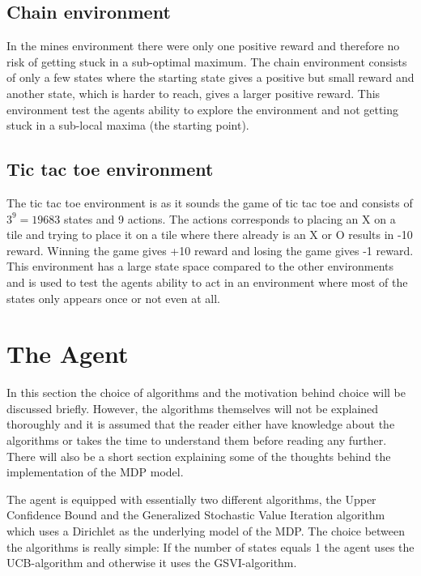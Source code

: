\documentclass[11pt]{article}
\numberwithin{equation}{section}
\begin{document}
\begin{flushleft}
\subsection{Chain environment}

In the mines environment there were only one positive reward and therefore no risk of getting stuck in a sub-optimal maximum. The chain environment consists of only a few states where the starting state gives a positive but small reward and another state, which is harder to reach, gives a larger positive reward. This environment test the agents ability to explore the environment and not getting stuck in a sub-local maxima (the starting point).

\subsection{Tic tac toe environment}

The tic tac toe environment is as it sounds the game of tic tac toe and consists of $3^9=19683$ states and 9 actions. The actions corresponds to placing an X on a tile and trying to place it on a tile where there already is an X or O results in -10 reward. Winning the game gives +10 reward and losing the game gives -1 reward. This environment has a large state space compared to the other environments and is used to test the agents ability to act in an environment where most of the states only appears once or not even at all.

\section{The Agent}

In this section the choice of algorithms and the motivation behind choice will be discussed briefly. However, the algorithms themselves will not be explained thoroughly and it is assumed that the reader either have knowledge about the algorithms or takes the time to understand them before reading any further. There will also be a short section explaining some of the thoughts behind the implementation of the MDP model. \newline

The agent is equipped with essentially two different algorithms, the Upper Confidence Bound and the Generalized Stochastic Value Iteration algorithm which uses a Dirichlet as the underlying model of the MDP. The choice between the algorithms is really simple: If the number of states equals 1 the agent uses the UCB-algorithm and otherwise it uses the GSVI-algorithm.


\end{flushleft}
\end{document}
